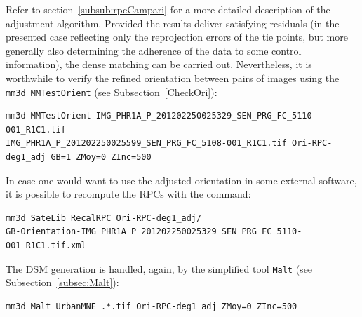 %   
Refer to section~\ref{subsub:rpcCampari} for a more detailed description of the adjustment algorithm. Provided the results deliver satisfying residuals (in the presented case reflecting only the reprojection errors of the tie points, but more generally also determining the adherence of the data to some control information), the dense matching can be carried out. Nevertheless, it is worthwhile to verify the refined orientation between pairs of images using the {\tt mm3d MMTestOrient} (see Subsection~\ref{CheckOri}):
\begin{verbatim}
mm3d MMTestOrient IMG_PHR1A_P_201202250025329_SEN_PRG_FC_5110-001_R1C1.tif 
IMG_PHR1A_P_201202250025599_SEN_PRG_FC_5108-001_R1C1.tif Ori-RPC-deg1_adj GB=1 ZMoy=0 ZInc=500
\end{verbatim}
%
In case one would want to use the adjusted orientation in some external software, it is possible to recompute the RPCs with the command:
\begin{verbatim}
mm3d SateLib RecalRPC Ori-RPC-deg1_adj/
GB-Orientation-IMG_PHR1A_P_201202250025329_SEN_PRG_FC_5110-001_R1C1.tif.xml
\end{verbatim}
The DSM generation is handled, again, by the simplified tool {\tt Malt} (see Subsection~\ref{subsec:Malt}): 
\begin{verbatim}
mm3d Malt UrbanMNE .*.tif Ori-RPC-deg1_adj ZMoy=0 ZInc=500
\end{verbatim}
%







%
